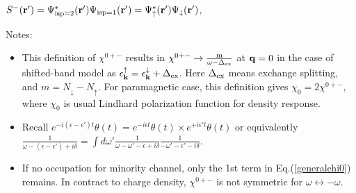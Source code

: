 \documentclass[a4paper,10pt,epsf,fleqn]{article}
\newcommand{\bfk}{{\bf k}}
\newcommand{\bfr}{{\bf r}}
\newcommand{\ispone}{\downarrow}
\newcommand{\isptwo}{\uparrow}
\newcommand{\eps}{\epsilon}
\newcommand{\req}[1]{Eq.(\ref{#1})}
\begin{document}
\noindent $S^-(\bfr') = \Psi_{\rm isp=2}^*(\bfr') \Psi_{\rm isp=1}(\bfr') 
= \Psi_{\rm \isptwo}^*(\bfr') \Psi_{\rm \ispone}(\bfr')$, \ 



\noindent Notes:
\begin{itemize}
\item This definition of $\chi^{0+-}$ 
results in $\chi^{0+-} \to \frac{\rm m}{\omega-\Delta_{\rm ex}}$
at ${\bf q}=0$ in the case of shifted-band model as 
$\epsilon_\bfk^\isptwo = \epsilon_\bfk^\ispone + \Delta_{\rm ex}$.
Here $\Delta_{\rm ex}$ means exchange splitting, and $m = N_\ispone- N_\isptwo$.
For paramagnetic case, this definition gives $\chi_0 = 2 \chi^{0+-}$, where
 $\chi_0$ is usual Lindhard polarization function for density response.

\item Recall 
$ e^{-i (\eps-\eps') t} \theta(t)  = e^{-i \eps t} \theta(t) \times e^{+i \eps' t} \theta(t)$ 
or equivalently 
$ \frac{1}{\omega-(\eps-\eps')+i \delta}= \int d\omega' \frac{1}{\omega-\omega'-\eps+i \delta} \frac{1}{-\omega'-\eps'-i \delta}$.

\item If no occupation for minority channel, only the 1st term in \req{generalchi0} remains.
In contract to charge density, $\chi^{0+-}$ is not symmetric for $\omega \leftrightarrow -\omega$. 
\end{itemize}
\end{document}
